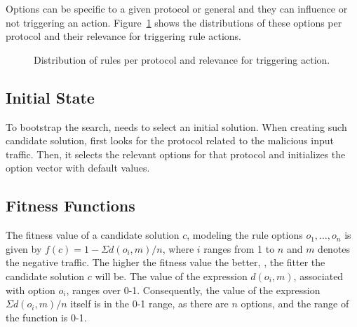 \documentclass[conference]{IEEEtran}
\begin{document}
Options can be specific to a given protocol or general and they can
influence or not triggering an
action. Figure~\ref{fig:distribution-rules-protocol} shows the
distributions of these options per protocol and their relevance for
triggering rule actions.

\pgfplotsset{width=5.5cm,compat=1.8}
\begin{figure}[h!]
  \centering
  \caption{\label{fig:distribution-rules-protocol}Distribution of
    rules per protocol and relevance for triggering action.}
\end{figure}

\subsection{Initial State}

To bootstrap the search, \tname{} needs to select an initial
solution. When creating such candidate solution, \tname{} first looks
for the protocol related to the malicious input traffic. Then, it
selects the relevant options for that protocol and initializes the
option vector with default values. 


\subsection{Fitness Functions}

The fitness value of a candidate solution $c$, modeling the rule
options $o_1, \dots, o_n$ is given by $f(c)=1-\Sigma{d(o_i,m)}/n$,
where $i$ ranges from 1 to $n$ and $m$ denotes the negative
traffic. The higher the fitness value the better, \ie{}, the fitter
the candidate solution $c$ will be.  The value of the expression
$d(o_i,m)$, associated with option $o_i$, ranges over
0-1. Consequently, the value of the expression $\Sigma{d(o_i,m)}/n$
itself is in the 0-1 range, as there are $n$ options, and the range of
the function is 0-1.
\end{document}
